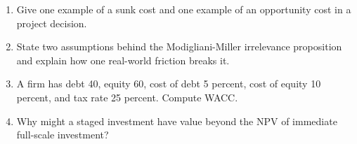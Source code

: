 \begin{exerciseblock}
\begin{enumerate}
  \item Give one example of a sunk cost and one example of an opportunity cost in a project decision.
  \item State two assumptions behind the Modigliani-Miller irrelevance proposition and explain how one real-world friction breaks it.
  \item A firm has debt 40, equity 60, cost of debt 5 percent, cost of equity 10 percent, and tax rate 25 percent. Compute WACC.
  \item Why might a staged investment have value beyond the NPV of immediate full-scale investment?
\end{enumerate}
\end{exerciseblock}

